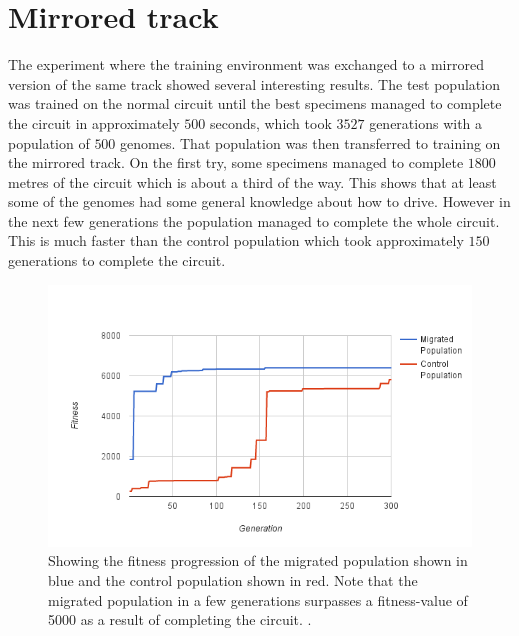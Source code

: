 


\section{Mirrored track}
\label{result:mirror}
The experiment where the training environment was exchanged to a mirrored version of the same track showed several interesting results. The test population was trained on the normal circuit until the best specimens managed to complete the circuit in approximately $500$ seconds, which took $3527$ generations with a population of $500$ genomes. That population was then transferred to training on the mirrored track. On the first try, some specimens managed to complete $1800$ metres of the circuit which is about a third of the way. This shows that at least some of the genomes had some general knowledge about how to drive. However in the next few generations the population managed to complete the whole circuit. This is much faster than the control population which took approximately $150$ generations to complete the circuit. 


\begin{figure}[H]
\includegraphics[width=\textwidth]{report/images/graphs/mirror_migration}
\centering
\caption{Showing the fitness progression of the migrated population shown in blue and the control population shown in red. Note that the migrated population in a few generations surpasses a fitness-value of 5000 as a result of completing the circuit. . }
\label{fig:mirrordata}
\end{figure}

